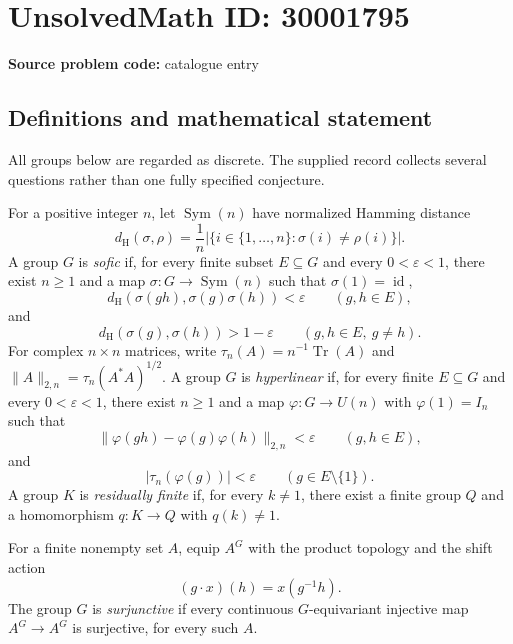 \documentclass[11pt]{article}
\begin{document}
\section*{UnsolvedMath ID: 30001795}
\textbf{Source problem code:} catalogue entry
\subsection{Definitions and mathematical statement}
All groups below are regarded as discrete. The supplied record collects several questions rather than one fully specified conjecture.

For a positive integer \(n\), let \(\operatorname{Sym}(n)\) have normalized Hamming distance
\[
 d_{\mathrm H}(\sigma,\rho)=\frac{1}{n}\bigl|\{i\in\{1,\ldots,n\}:\sigma(i)\ne\rho(i)\}\bigr|.
\]
A group \(G\) is \emph{sofic} if, for every finite subset \(E\subseteq G\) and every \(0<\varepsilon<1\), there exist \(n\geq1\) and a map \(\sigma:G\to\operatorname{Sym}(n)\) such that \(\sigma(1)=\operatorname{id}\),
\[
 d_{\mathrm H}(\sigma(gh),\sigma(g)\sigma(h))<\varepsilon\qquad(g,h\in E),
\]
and
\[
 d_{\mathrm H}(\sigma(g),\sigma(h))>1-\varepsilon\qquad(g,h\in E,\ g\ne h).
\]
For complex \(n\times n\) matrices, write \(\tau_n(A)=n^{-1}\operatorname{Tr}(A)\) and \(\|A\|_{2,n}=\tau_n(A^*A)^{1/2}\). A group \(G\) is \emph{hyperlinear} if, for every finite \(E\subseteq G\) and every \(0<\varepsilon<1\), there exist \(n\geq1\) and a map \(\varphi:G\to U(n)\) with \(\varphi(1)=I_n\) such that
\[
 \|\varphi(gh)-\varphi(g)\varphi(h)\|_{2,n}<\varepsilon\qquad(g,h\in E),
\]
and
\[
 |\tau_n(\varphi(g))|<\varepsilon\qquad(g\in E\setminus\{1\}).
\]
A group \(K\) is \emph{residually finite} if, for every \(k\ne1\), there exist a finite group \(Q\) and a homomorphism \(q:K\to Q\) with \(q(k)\ne1\).

For a finite nonempty set \(A\), equip \(A^G\) with the product topology and the shift action
\[
 (g\cdot x)(h)=x(g^{-1}h).
\]
The group \(G\) is \emph{surjunctive} if every continuous \(G\)-equivariant injective map \(A^G\to A^G\) is surjective, for every such \(A\).
\end{document}
